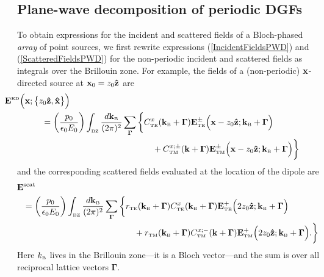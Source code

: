 \documentclass[letterpaper]{article}
\newcommand{\vbGamma}{\boldsymbol{\Gamma}}
\begin{document}
\subsection{Plane-wave decomposition of periodic DGFs}

To obtain expressions for the incident and scattered
fields of a Bloch-phased \textit{array} of point sources,
we first rewrite expressions (\ref{IncidentFieldsPWD})
and (\ref{ScatteredFieldsPWD}) for the non-periodic
incident and scattered fields as integrals over the 
Brillouin zone. For example, the fields of a (non-periodic)
$\mathbf{x}$-directed source at $\mathbf{x}_0=z_0\mathbf{\hat z}$ are
\begin{align*}
 &\hspace{-0.6in}
\vb E\supt{ED}\Big(\vb x; \big\{ z_0 \vbhat{z}, \vbhat{x} \big\}\Big)
\\
 &= \pf{p_0}{\epsilon_0 E_0}
    \int\subt{BZ} \frac{d \vb k\subt{B}}{(2\pi)^2} 
    \sum_{\vbGamma}
    \bigg\{ C^{x}\subt{TE}(\vb k\subt{B} + \vbGamma)
	    \vb E^\pm\subt{TE}\Big(\vb x-z_0\vbhat{z}; \vb k\subt{B}+\vbGamma\Big)
\\
&\hspace{1.8in} + 
           C^{x;\pm}\subt{TM}(\vb k+\vbGamma)
	   \vb E^\pm\subt{TM}\Big(\vb x-z_0\vbhat{z}; \vb k\subt{B}+\vbGamma\Big)
   \bigg\}
\end{align*}
and the corresponding scattered fields evaluated at the location
of the dipole are
\begin{align*}
 &\hspace{-0.1in}
\vb E\sups{scat}
\\
 &= \pf{p_0}{\epsilon_0 E_0}
    \int\subt{BZ} \frac{d \vb k\subt{B}}{(2\pi)^2} 
    \sum_{\vbGamma}
    \bigg\{ r\subt{TE}(\vb k\subt{B} + \vbGamma)
            C^{x}\subt{TE}(\vb k\subt{B} + \vbGamma)
	    \vb E^+\subt{TE}\Big(2z_0\vbhat{z}; \vb k\subt{B}+\vbGamma\Big)
\\
&\hspace{1.8in} + 
            r\subt{TM}(\vb k\subt{B} + \vbGamma)
           C^{x;-}\subt{TM}(\vb k+\vbGamma)
	   \vb E^+\subt{TM}\Big(2z_0\vbhat{z}; \vb k\subt{B}+\vbGamma\Big).
   \bigg\}
\end{align*}
Here $k_{\hbox{\tiny{B}}}$ lives in the Brillouin zone---it is a Bloch vector---and
the sum is over all reciprocal lattice vectors $\vbGamma$.
\end{document}

